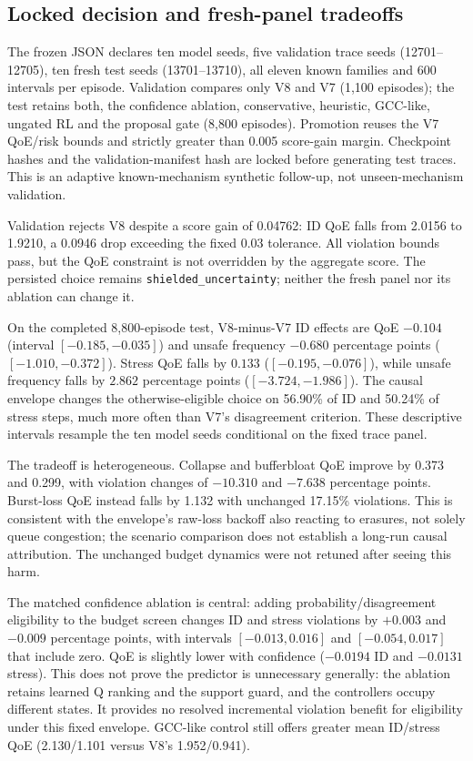 \documentclass[10pt]{article}
\begin{document}
\subsection{Locked decision and fresh-panel tradeoffs}
The frozen JSON declares ten model seeds, five validation trace seeds (12701--12705), ten fresh test seeds (13701--13710), all eleven known families and 600 intervals per episode. Validation compares only V8 and V7 (1,100 episodes); the test retains both, the confidence ablation, conservative, heuristic, GCC-like, ungated RL and the proposal gate (8,800 episodes). Promotion reuses the V7 QoE/risk bounds and strictly greater than 0.005 score-gain margin. Checkpoint hashes and the validation-manifest hash are locked before generating test traces. This is an adaptive known-mechanism synthetic follow-up, not unseen-mechanism validation.

Validation rejects V8 despite a score gain of 0.04762: ID QoE falls from 2.0156 to 1.9210, a 0.0946 drop exceeding the fixed 0.03 tolerance. All violation bounds pass, but the QoE constraint is not overridden by the aggregate score. The persisted choice remains \texttt{shielded\_uncertainty}; neither the fresh panel nor its ablation can change it.

On the completed 8,800-episode test, V8-minus-V7 ID effects are QoE $-0.104$ (interval $[-0.185,-0.035]$) and unsafe frequency $-0.680$ percentage points ($[-1.010,-0.372]$). Stress QoE falls by $0.133$ ($[-0.195,-0.076]$), while unsafe frequency falls by $2.862$ percentage points ($[-3.724,-1.986]$). The causal envelope changes the otherwise-eligible choice on 56.90\% of ID and 50.24\% of stress steps, much more often than V7's disagreement criterion. These descriptive intervals resample the ten model seeds conditional on the fixed trace panel.

The tradeoff is heterogeneous. Collapse and bufferbloat QoE improve by 0.373 and 0.299, with violation changes of $-10.310$ and $-7.638$ percentage points. Burst-loss QoE instead falls by 1.132 with unchanged 17.15\% violations. This is consistent with the envelope's raw-loss backoff also reacting to erasures, not solely queue congestion; the scenario comparison does not establish a long-run causal attribution. The unchanged budget dynamics were not retuned after seeing this harm.

The matched confidence ablation is central: adding probability/disagreement eligibility to the budget screen changes ID and stress violations by $+0.003$ and $-0.009$ percentage points, with intervals $[-0.013,0.016]$ and $[-0.054,0.017]$ that include zero. QoE is slightly lower with confidence ($-0.0194$ ID and $-0.0131$ stress). This does not prove the predictor is unnecessary generally: the ablation retains learned Q ranking and the support guard, and the controllers occupy different states. It provides no resolved incremental violation benefit for eligibility under this fixed envelope. GCC-like control still offers greater mean ID/stress QoE (2.130/1.101 versus V8's 1.952/0.941).
\end{document}
